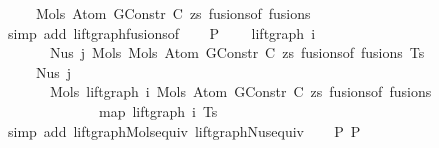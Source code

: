 \begin{isabellebody}
\ \ \ \ \ Mols{}\ {\isacharparenleft}{\kern0pt}Atom\ {\isacharparenleft}{\kern0pt}GConstr\ C{\isacharparenright}{\kern0pt}\ zs{\isacharparenright}{\kern0pt}\ {\isacharparenleft}{\kern0pt}fusions{\isacharunderscore}{\kern0pt}of\ fusions{\isacharparenright}{\kern0pt}{\isachardoublequoteclose}\isanewline
\ \ \ \ \isamarkupfalse%
\ {\isacharparenleft}{\kern0pt}simp\ add{\isacharcolon}{\kern0pt}\ lift{\isacharunderscore}{\kern0pt}graph{\isacharunderscore}{\kern0pt}fusions{\isacharunderscore}{\kern0pt}of{\isacharparenright}{\kern0pt}\isanewline
\isanewline
\ \ \isamarkupfalse%
\ P{}{\isacharcolon}{\kern0pt}\isanewline
\ \ \ \ {\isachardoublequoteopen}lift{\isacharunderscore}{\kern0pt}graph\ i\isanewline
\ \ \ \ \ \ \ {\isacharparenleft}{\kern0pt}Nus{}\ j\ {\isacharparenleft}{\kern0pt}Mols{}\ {\isacharparenleft}{\kern0pt}Mols{}\ {\isacharparenleft}{\kern0pt}Atom\ {\isacharparenleft}{\kern0pt}GConstr\ C{\isacharparenright}{\kern0pt}\ zs{\isacharparenright}{\kern0pt}\ {\isacharparenleft}{\kern0pt}fusions{\isacharunderscore}{\kern0pt}of\ fusions{\isacharparenright}{\kern0pt}{\isacharparenright}{\kern0pt}\ Ts{\isacharparenright}{\kern0pt}{\isacharparenright}{\kern0pt}\ {\isacharequal}{\kern0pt}\isanewline
\ \ \ \ \ Nus{}\ j\isanewline
\ \ \ \ \ \ \ {\isacharparenleft}{\kern0pt}Mols{}\ {\isacharparenleft}{\kern0pt}lift{\isacharunderscore}{\kern0pt}graph\ i\ {\isacharparenleft}{\kern0pt}Mols{}\ {\isacharparenleft}{\kern0pt}Atom\ {\isacharparenleft}{\kern0pt}GConstr\ C{\isacharparenright}{\kern0pt}\ zs{\isacharparenright}{\kern0pt}\ {\isacharparenleft}{\kern0pt}fusions{\isacharunderscore}{\kern0pt}of\ fusions{\isacharparenright}{\kern0pt}{\isacharparenright}{\kern0pt}{\isacharparenright}{\kern0pt}\isanewline
\ \ \ \ \ \ \ \ \ \ \ \ \ \ {\isacharparenleft}{\kern0pt}map\ {\isacharparenleft}{\kern0pt}lift{\isacharunderscore}{\kern0pt}graph\ i{\isacharparenright}{\kern0pt}\ Ts{\isacharparenright}{\kern0pt}{\isacharparenright}{\kern0pt}{\isachardoublequoteclose}\isanewline
\ \ \ \ \isamarkupfalse%
\ {\isacharparenleft}{\kern0pt}simp\ add{\isacharcolon}{\kern0pt}\ lift{\isacharunderscore}{\kern0pt}graph{\isacharunderscore}{\kern0pt}Mols{}{\isacharunderscore}{\kern0pt}equiv\ lift{\isacharunderscore}{\kern0pt}graph{\isacharunderscore}{\kern0pt}Nus{}{\isacharunderscore}{\kern0pt}equiv{\isacharparenright}{\kern0pt}\isanewline
\isanewline
\ \ \isamarkupfalse%
\ P{}\ P{}\ \isamarkupfalse%

\end{isabellebody}
